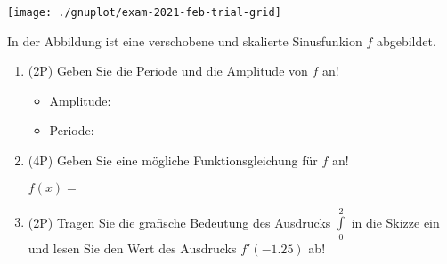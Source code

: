 \begin{center}
	\texttt{[image: ./gnuplot/exam-2021-feb-trial-grid]}
\end{center}

In der Abbildung ist eine verschobene und skalierte Sinusfunkion $f$ abgebildet.

\begin{enumerate}[label=(\alph*)]

	\item (2P) Geben Sie die Periode und die Amplitude von $f$ an!

		\begin{itemize}
			\item Amplitude:
	
			\bigskip
			\bigskip
	
			\item Periode:
	
			\bigskip
			\bigskip
		\end{itemize}
	
	\item (4P) Geben Sie eine mögliche Funktionsgleichung für $f$ an!

		\bigskip $f(x) =$
		\bigskip
		\bigskip
		
    \item (2P) Tragen Sie die grafische Bedeutung des Ausdrucks $\int\limits_{0}^2$ in die Skizze ein und lesen Sie den Wert des Ausdrucks $f'(-1.25)$ ab!
	
\end{enumerate}

